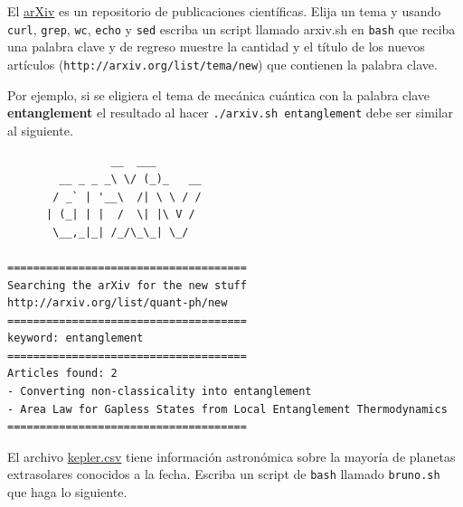\documentclass[11pt,letterpaper]{exam}
\begin{document}
\begin{questions}
 

El \href{http://en.wikipedia.org/wiki/ArXiv}{arXiv} es un repositorio de publicaciones científicas. Elija un tema y usando \verb+curl+, \verb+grep+, \verb+wc+, \verb+echo+ y \verb+sed+ escriba un script llamado arxiv.sh en \verb+bash+ que reciba una palabra clave y de regreso muestre la cantidad y el título de los nuevos artículos (\verb+http://arxiv.org/list/tema/new+) que contienen la palabra clave.

Por ejemplo, si se eligiera el tema de mecánica cuántica con la palabra clave \textbf{entanglement} el resultado al hacer \verb+./arxiv.sh entanglement+ debe ser similar al siguiente.

\begin{verbatim}
                __  ___       
        __ _ _ _\ \/ (_)_   __
       / _` | '__\  /| \ \ / /
      | (_| | |  /  \| |\ V / 
       \__,_|_| /_/\_\_| \_/  
                              
=====================================
Searching the arXiv for the new stuff
http://arxiv.org/list/quant-ph/new
=====================================
keyword: entanglement
=====================================
Articles found: 2
- Converting non-classicality into entanglement
- Area Law for Gapless States from Local Entanglement Thermodynamics
=====================================
\end{verbatim}


El archivo \href{keplerurl}{kepler.csv} tiene información astronómica sobre la mayoría de planetas extrasolares conocidos a la fecha. Escriba un script de \verb+bash+ llamado \verb+bruno.sh+ que haga lo siguiente.



\end{questions}
\end{document}
